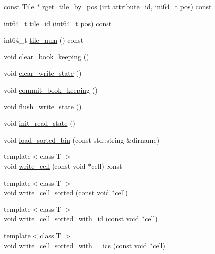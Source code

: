 \begin{DoxyCompactItemize}
\item 
const \hyperlink{classTile}{Tile} $\ast$ \hyperlink{classFragment_a7fbc6fb249aed1016111e9c92c95ac51}{rget\+\_\+tile\+\_\+by\+\_\+pos} (int attribute\+\_\+id, int64\+\_\+t pos) const 
\item 
int64\+\_\+t \hyperlink{classFragment_a57731aa914ccb0f784333da54712b17d}{tile\+\_\+id} (int64\+\_\+t pos) const 
\item 
int64\+\_\+t \hyperlink{classFragment_ac1deb7dc6b163313c65be1877a40b42c}{tile\+\_\+num} () const 
\item 
void \hyperlink{classFragment_ad25f9c90649e287ff41e645ceb6ec954}{clear\+\_\+book\+\_\+keeping} ()
\item 
void \hyperlink{classFragment_acbbcd1833f770a7ac41264dfc8ed7bd7}{clear\+\_\+write\+\_\+state} ()
\item 
void \hyperlink{classFragment_aa0cf4af1c1155d811b4f3687c5154bfd}{commit\+\_\+book\+\_\+keeping} ()
\item 
void \hyperlink{classFragment_a654ad9990b763a9db422346e8673956c}{flush\+\_\+write\+\_\+state} ()
\item 
void \hyperlink{classFragment_adbbc63ebc9f09d859756c2e23ab87327}{init\+\_\+read\+\_\+state} ()
\item 
void \hyperlink{classFragment_a13b2d8f60ae979a9febb22bba9c81a7f}{load\+\_\+sorted\+\_\+bin} (const std\+::string \&dirname)
\item 
{\footnotesize template$<$class T $>$ }\\void \hyperlink{classFragment_a8a3f38a8e4f868571f2bd4ab0b6c33b9}{write\+\_\+cell} (const void $\ast$cell) const 
\item 
{\footnotesize template$<$class T $>$ }\\void \hyperlink{classFragment_af0adee431f981147850b48dbb3245d5a}{write\+\_\+cell\+\_\+sorted} (const void $\ast$cell)
\item 
{\footnotesize template$<$class T $>$ }\\void \hyperlink{classFragment_a7272eae9c27e54d8860bc33e293b2898}{write\+\_\+cell\+\_\+sorted\+\_\+with\+\_\+id} (const void $\ast$cell)
\item 
{\footnotesize template$<$class T $>$ }\\void \hyperlink{classFragment_aca2661153d474f2c121556684074b325}{write\+\_\+cell\+\_\+sorted\+\_\+with\+\_\+\_\+ids} (const void $\ast$cell)
\end{DoxyCompactItemize}
